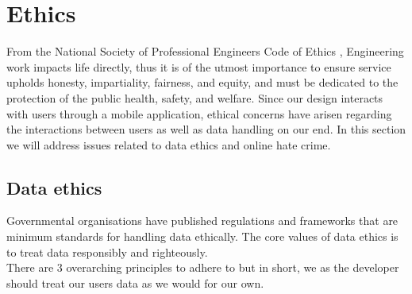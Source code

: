 \section{Ethics}
From the National Society of Professional Engineers Code of Ethics \cite{codeofethics}, Engineering
work impacts life directly, thus it is of the utmost importance to ensure service 
upholds honesty, impartiality, fairness, and equity, and must be dedicated to the protection of
the public health, safety, and welfare. Since our design interacts with users
through a mobile application, ethical concerns have arisen regarding the interactions between users 
as well as data handling on our end. In this section we will address issues related to data ethics 
and online hate crime.

\subsection{Data ethics}
Governmental organisations have published regulations \cite{EUdataregulations2018} and frameworks
\cite{framework} that are minimum standards for handling data ethically. The core values of data ethics 
is to treat data responsibly and righteously.
\\
There are 3 overarching principles\cite{framework} to adhere to but in short, we as the developer should treat our 
users\textsc{} data as we would for our own.

